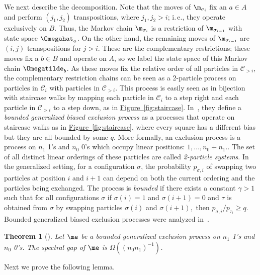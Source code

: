 \documentclass[11pt]{article}
\newtheorem{theorem}{Theorem}[section]
\providecommand{\ie}{i.\,e.}
\providecommand{\expref}[2]{\texorpdfstring{\hyperref[#2]{#1~\ref{#2}}}{#1~\ref{#2}}}
\begin{document}
We next describe the decomposition.  Note that the moves of 
$\m_{\sigma_i}$ fix an $a \in A$ and 
perform $(j_1,j_2)$ transpositions, where $j_1,j_2>i$; \ie,  they 
operate exclusively on $B$. Thus, the Markov chain $\m_{\sigma_i}$ is a 
restriction of $\m_{\sigma_{i-1}}$ with state space 
$\Omegahat_{a}$.
On the other hand, the remaining moves of $\m_{\sigma_{i-1}}$ 
are $(i,j)$ transpositions for $j>i$.  These are the complementary 
restrictions; these moves fix a $b \in B$ and operate on $A$, so we 
label the state space of this Markov chain $\Omegatilde_b$.  As these 
moves fix the relative order of all particles in $\mathcal{C}_{>i}$, 
the complementary restriction chains can be seen as a 2-particle process on particles in $\mathcal{C}_{i}$  with particles in $\mathcal{C}_{> i}$.  This process is easily seen as in bijection with staircase walks by mapping each particle in $\mathcal{C}_{i}$ to a step right and each particle in $\mathcal{C}_{> i}$ to a step down, as in \expref{Figure}{fig:staircase}.  
In~\cite{MS}, they define a \emph{bounded generalized biased exclusion process}  as a processes that operate on 
staircase walks as in \expref{Figure}{fig:staircase}, where every square 
has a different bias but they are all bounded by some $q$.  More formally, an exclusion process is a process on $n_1$ 1's and $n_0$ 0's which occupy linear positions: $1, \ldots, n_0 + n_1.$. The set of all distinct linear orderings of these particles are called \emph{2-particle systems}.  In the generalized setting, for a configuration $\sigma$, the probability $p_{\sigma, i}$ of swapping two particles at position $i$ and $i+1$  can depend on both the current ordering and the particles being exchanged.  The process is \emph{bounded} if there exists  a constant $\gamma > 1$ such that for all configurations $\sigma$ if $\sigma(i)  =1$ and $\sigma(i+1) = 0$ and $\tau$ is obtained from $\sigma$ by swapping particles $\sigma(i)$ and $\sigma(i+1),$ then $p_{\sigma,i}/p_{\tau_i}\geq q.$  Bounded generalized biased exclusion 
processes were analyzed in~\cite{MS}. 

\begin{theorem}[\cite{MS}]\label{boundedBias} Let $\me$ be a bounded 
generalized exclusion process on $n_1$ 1's and $n_0$ 0's.  The spectral 
gap of $\me$ is $\Omega((n_0n_1)^{-1})$.
\end{theorem}

Next we prove the following lemma.  
\end{document}
